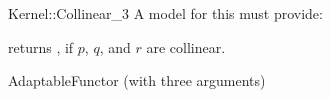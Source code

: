 \begin{ccRefFunctionObjectConcept}{Kernel::Collinear_3}
A model for this must provide:


{returns , if $p$, $q$, and $r$ are collinear.}

\ccRefines
AdaptableFunctor (with three arguments)

\ccSeeAlso
{}  \\

\end{ccRefFunctionObjectConcept}
